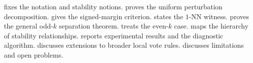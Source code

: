  fixes the notation and stability notions.
 proves the uniform perturbation decomposition.
 gives the signed-margin criterion.
 states the $1$-NN witness.
 proves the general odd-$k$ separation theorem.
 treats the even-$k$ case.
 maps the hierarchy of stability relationships.
 reports experimental results and the diagnostic
algorithm.  discusses extensions to broader
local vote rules.  discusses limitations and open
problems.
